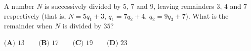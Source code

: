 A number $N$ is successively divided by $5$, $7$ and $9$, leaving remainders $3$, $4$ and $7$ respectively (that is, $N=5q_1+3$, $q_1=7q_2+4$, $q_2=9q_3+7$). What is the remainder when $N$ is divided by $35$?

$\textbf{(A) } 13\qquad\textbf{(B) } 17\qquad\textbf{(C) } 19\qquad\textbf{(D) } 23$
